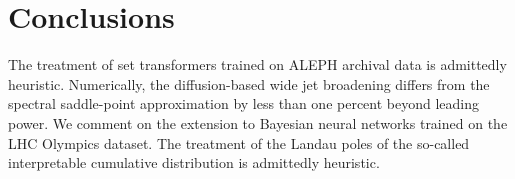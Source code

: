 \section{Conclusions}\label{sec:conclusions}

The treatment of set transformers trained on ALEPH archival data is
admittedly heuristic. Numerically, the diffusion-based wide jet
broadening differs from the spectral saddle-point approximation by less
than one percent beyond leading power. We comment on the extension to
Bayesian neural networks trained on the LHC Olympics dataset. The
treatment of the Landau poles of the so-called interpretable cumulative
distribution is admittedly heuristic.

